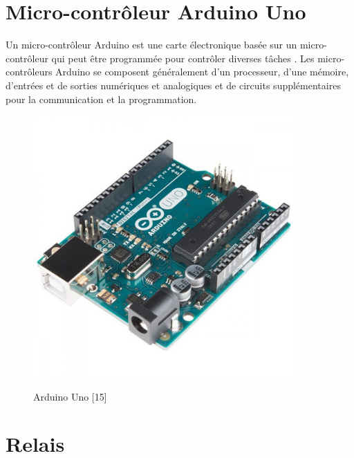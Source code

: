 \section{Micro-contrôleur Arduino Uno}
Un micro-contrôleur Arduino est une carte électronique basée sur un micro-contrôleur qui peut être programmée pour contrôler diverses tâches . Les micro-contrôleurs Arduino se composent généralement d'un processeur, d'une mémoire, d'entrées et de sorties numériques et analogiques et de circuits supplémentaires pour la communication et la programmation.  
\begin{figure}[hbt]
\centering
\label{fig:Arduino Uno}

  {\includegraphics[width=10cm]{figures/DZD000371-1000x1000.jpg}}
  \caption{Arduino Uno [15]}
\end{figure}
\pagebreak
\section{Relais}

